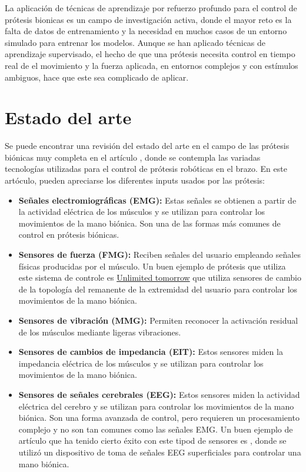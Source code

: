 La aplicación de técnicas de aprendizaje por refuerzo profundo para el control de prótesis bionicas es un campo de investigación activa, donde el mayor reto es la falta de datos de entrenamiento y la necesidad en muchos casos de un entorno simulado para entrenar los modelos. Aunque se han aplicado técnicas de aprendizaje supervisado, el hecho de que una prótesis necesita control en tiempo real de el movimiento y la fuerza aplicada, en entornos complejos y con estímulos ambiguos, hace que este sea complicado de aplicar. 

\medskip

\section{Estado del arte}
\label{estado-del-arte}


Se puede encontrar una revisión del estado del arte en el campo de las prótesis biónicas muy completa en el artículo \citep{bionicreview2023}, donde se contempla las variadas tecnologías utilizadas para el control de prótesis robóticas en el brazo. En este artóculo, pueden apreciarse los diferentes inputs usados por las prótesis:
\begin{itemize}
    \item \textbf{Señales electromiográficas (EMG):} Estas señales se obtienen a partir de la actividad eléctrica de los músculos y se utilizan para controlar los movimientos de la mano biónica. Son una de las formas más comunes de control en prótesis biónicas.
    \item \textbf{Sensores de fuerza (FMG):} Reciben señales del usuario empleando señales físicas producidas por el músculo. Un buen ejemplo de prótesis que utiliza este sistema de controle es \href{https://www.unlimitedtomorrow.com/about-unlimited-tomorrow/}{Unlimited tomorrow} que utiliza sensores de cambio de la topología del remanente de la extremidad del usuario para controlar los movimientos de la mano biónica.
    \item \textbf{Sensores de vibración (MMG):} Permiten reconocer la activación residual de los músculos mediante ligeras vibraciones.
    \item \textbf{Sensores de cambios de impedancia (EIT):} Estos sensores miden la impedancia eléctrica de los músculos y se utilizan para controlar los movimientos de la mano biónica.
    \item \textbf{Sensores de señales cerebrales (EEG):} Estos sensores miden la actividad eléctrica del cerebro y se utilizan para controlar los movimientos de la mano biónica. Son una forma avanzada de control, pero requieren un procesamiento complejo y no son tan comunes como las señales EMG. Un buen ejemplo de artículo que ha tenido cierto éxito con este tipod de sensores es \citep{labeegprosthesis2023}, donde se utilizó un dispositivo de toma de señales EEG superficiales para controlar una mano biónica.
\end{itemize}

